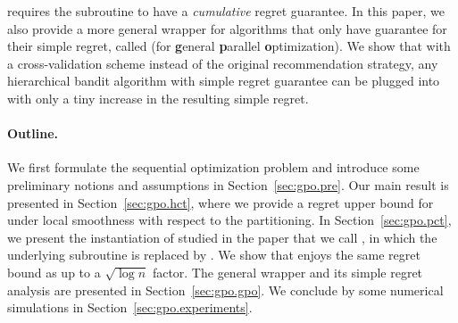 \POO requires the subroutine to have a \emph{cumulative} regret guarantee. In this paper, we also provide a more general wrapper for algorithms that only have guarantee for their simple regret, called \GPO (for \textbf{g}eneral \textbf{p}arallel \textbf{o}ptimization). We show that with a cross-validation scheme instead of the original recommendation strategy, any hierarchical bandit algorithm with simple regret guarantee can be plugged into \GPO with only a tiny increase in the resulting simple regret.

\paragraph{Outline.}
We first formulate the sequential optimization problem and introduce some preliminary notions and assumptions in Section~\ref{sec:gpo.pre}. Our main result is presented in Section~\ref{sec:gpo.hct}, where we provide a regret upper bound for \HCT under local smoothness with respect to the partitioning. In Section~\ref{sec:gpo.pct}, we present the instantiation of \POO studied in the paper that we call \PCT, in which the underlying subroutine \HOO is replaced by \HCT. We show that \PCT enjoys the same regret bound as \HCT up to a $\sqrt{\log n}$ factor. The general wrapper and its simple regret analysis are presented in Section~\ref{sec:gpo.gpo}. We conclude by some numerical simulations in Section~\ref{sec:gpo.experiments}.


